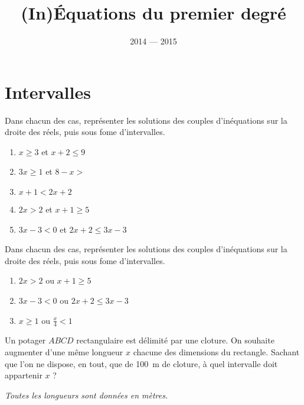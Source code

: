 \documentclass[14pt, aspectratio=169]{beamer}
\institute{Lycée Marie Curie}
\date{2014 --- 2015}
\title{(In)Équations du premier degré}
\begin{document}
\section{Intervalles}
\begin{frame}
  Dans chacun des cas, représenter les solutions des couples d'inéquations sur la droite des réels, puis sous fome d'intervalles.
  \begin{enumerate}
    \item $x\geq 3$ et $x+2\leq 9$
    \item $3x\geq1$ et $8-x>$
    \item $x+1<2x+2$
    \item $2x>2$ et $x+1\geq 5$
    \item $3x-3<0$ et $2x+2\leq 3x-3$
  \end{enumerate}
\end{frame}

\begin{frame}
  Dans chacun des cas, représenter les solutions des couples d'inéquations sur la droite des réels, puis sous fome d'intervalles.
  \begin{enumerate}
    \item $2x>2$ ou $x+1\geq 5$
    \item $3x-3<0$ ou $2x+2\leq 3x-3$
    \item $x\geq 1$ ou $\frac{x}{4}<1$
  \end{enumerate}
\end{frame}

\begin{frame}
  \begin{multicols}{2}

  Un potager $ABCD$ rectangulaire est délimité par une cloture. On souhaite augmenter d'une même longueur $x$ chacune des dimensions du rectangle. Sachant que l'on ne dispose, en tout, que de 100~m de cloture, à quel intervalle doit appartenir $x$ ?

  \columnbreak

  \begin{center}
  \end{center}
\end{multicols}

\emph{Toutes les longueurs sont données en mètres.}
\end{frame}
\end{document}

